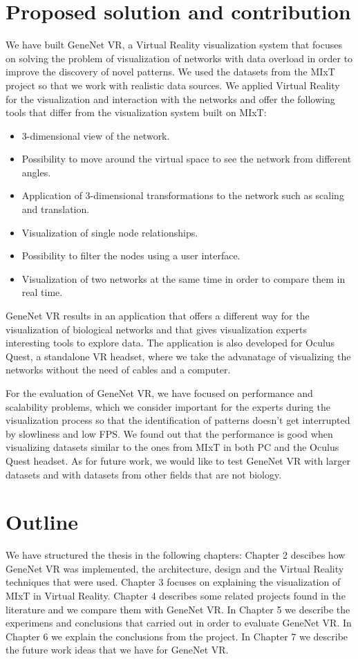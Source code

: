 \section{Proposed solution and contribution}
We have built GeneNet VR, a Virtual Reality visualization system that focuses on solving the problem of visualization of networks with data overload in order to improve the discovery of novel patterns. We used the datasets from the MIxT project so that we work with realistic data sources. We applied Virtual Reality for the visualization and interaction with the networks and offer the following tools that differ from the visualization system built on MIxT:

\begin{itemize}
  \item 3-dimensional view of the network.
  \item Possibility to move around the virtual space to see the network from different angles.
  \item Application of 3-dimensional transformations to the network such as scaling and translation.
  \item Visualization of single node relationships.
  \item Possibility to filter the nodes using a user interface.
  \item Visualization of two networks at the same time in order to compare them in real time.
\end{itemize}

GeneNet VR results in an application that offers a different way for the visualization of biological networks and that gives visualization experts interesting tools to explore data. The application is also developed for Oculus Quest, a standalone VR headset, where we take the advanatage of visualizing the networks without the need of cables and a computer.

For the evaluation of GeneNet VR, we have focused on performance and scalability problems, which we consider important for the experts during the visualization process so that the identification of patterns doesn't get interrupted by slowliness and low FPS. We found out that the performance is good when visualizing datasets similar to the ones from MIxT in both PC and the Oculus Quest headset. As for future work, we would like to test GeneNet VR with larger datasets and with datasets from other fields that are not biology.

\section{Outline}

We have structured the thesis in the following chapters: Chapter 2 descibes how GeneNet VR was implemented, the architecture, design and the Virtual Reality techniques that were used. Chapter 3 focuses on explaining the visualization of MIxT in Virtual Reality. Chapter 4 describes some related projects found in the literature and we compare them with GeneNet VR. In Chapter 5 we describe the experimens and conclusions that carried out in order to evaluate GeneNet VR. In Chapter 6 we explain the conclusions from the project. In Chapter 7 we describe the future work ideas that we have for GeneNet VR.
